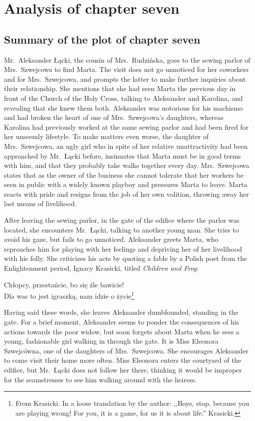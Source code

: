 
\section{Analysis of chapter seven}

\subsection{Summary of the plot of chapter seven}

Mr.\ Aleksander Łącki, the cousin of Mrs.\ Rudzińska, goes to the sewing parlor of Mrs.\ Szwejcowa to find Marta.
The visit does not go unnoticed for her coworkers and for Mrs.\ Szwejcowa, and prompts the latter to make further inquiries about their relationship.
She mentions that she had seen Marta the previous day in front of the Church of the Holy Cross, talking to Aleksander and Karolina, and revealing that she knew them both.
Aleksander was notorious for his machismo and had broken the heart of one of Mrs.\ Szwejcowa's daughters, whereas Karolina had previously worked at the same sewing parlor and had been fired for her unseemly lifestyle.
To make matters even worse, the daughter of Mrs.\ Szwejcowa, an ugly girl who in spite of her relative unattractivity had been approached by Mr.\ Łącki before, insinuates that Marta must be in good terms with him, and that they probably take walks together every day.
Mrs.\ Szwejcowa states that as the owner of the business she cannot tolerate that her workers be seen in public with a widely known playboy and pressures Marta to leave.
Marta reacts with pride and resigns from the job of her own volition, throwing away her last means of livelihood.

After leaving the sewing parlor, in the gate of the edifice where the parlor was located, she encounters Mr.\ Łącki, talking to another young man.
She tries to avoid his gaze, but fails to go unnoticed.
Aleksander greets Marta, who reproaches him for playing with her feelings and depriving her of her livelihood with his folly.
She criticizes his acts by quoting a fable by a Polish poet from the Enlightenment period, Ignacy Krasicki, titled \textit{Children and Frog}:

\begin{displayquote}
    Chłopcy, przestańcie, bo się źle bawicie!\\
    Dla was to jest igraszką, nam idzie o życie\footnote{%
      From Krasicki. In a loose translation by the author: ,,Boys, stop, because you are playing wrong! For you, it is a game, for us it is about life.'' Krasicki.}
\end{displayquote}

Having said these words, she leaves Aleksander dumbfounded, standing in the gate.
For a brief moment, Aleksander seems to ponder the consequences of his actions towards the poor widow, but soon forgets about Marta when he sees a young, fashionable girl walking in through the gate.
It is Miss Eleonora Szwejcówna, one of the daughters of Mrs.\ Szwejcowa.
She encourages Aleksander to come visit their home more often.
Miss Eleonora enters the courtyard of the edifice, but Mr.\ Łącki does not follow her there, thinking it would be improper for the seamstresses to see him walking around with the heiress.
